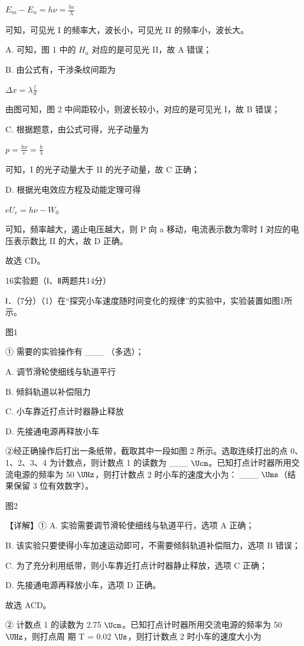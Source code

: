 \documentclass[\gkver]{gaokaozhenti}
\begin{document}
\begin{enumerate}
{ $E_{m}-E_{n}=h\nu=\frac{hc}{\lambda}$

可知，可见光 I 的频率大，波长小，可见光 II 的频率小，波长大。

A. 可知，图 1 中的  $H_{a}$ 对应的是可见光 II，故 A 错误；

B. 由公式有，干涉条纹间距为

 $\Delta x = \lambda \frac{l}{d}$

由图可知，图 2 中间距较小，则波长较小，对应的是可见光 I，故 B 错误；

C. 根据题意，由公式可得，光子动量为

 $p = \frac{h\nu}{c} = \frac{h}{\lambda}$

可知，I 的光子动量大于 II 的光子动量，故 C 正确；

D. 根据光电效应方程及动能定理可得

 $eU_{c}=h\nu-W_{0}$

可知，频率越大，遏止电压越大，则 P 向 a 移动，电流表示数为零时 I 对应的电压表示数比 II 的大，故 D 正确。

故选 CD。



16\. 实验题（Ⅰ、Ⅱ两题共14分）

Ⅰ．（7分）（1）在“探究小车速度随时间变化的规律”的实验中，实验装置如图1所示。

图1

① 需要的实验操作有 \_\_\_ （多选）；

A. 调节滑轮使细线与轨道平行

B. 倾斜轨道以补偿阻力

C. 小车靠近打点计时器静止释放

D. 先接通电源再释放小车

②经正确操作后打出一条纸带，截取其中一段如图 2 所示。选取连续打出的点 0、1、2、3、4 为计数点，则计数点 1 的读数为 \_\_\_ $\Ucm$。已知打点计时器所用交流电源的频率为 50 $\UHz$，则打计数点 2 时小车的速度大小为： \_\_\_ $\Ums$（结果保留 3 位有效数字）。

图2

【详解】① A. 实验需要调节滑轮使细线与轨道平行，选项 A 正确；

B. 该实验只要使得小车加速运动即可，不需要倾斜轨道补偿阻力，选项 B 错误；

C. 为了充分利用纸带，则小车靠近打点计时器静止释放，选项 C 正确；

D. 先接通电源再释放小车，选项 D 正确。

故选 ACD。

② 计数点 1 的读数为 2.75 $\Ucm$。已知打点计时器所用交流电源的频率为 50 $\UHz$，则打点周
期 T = 0.02 $\Us$，则打计数点 2 时小车的速度大小为

}
\end{enumerate}
\end{document}
